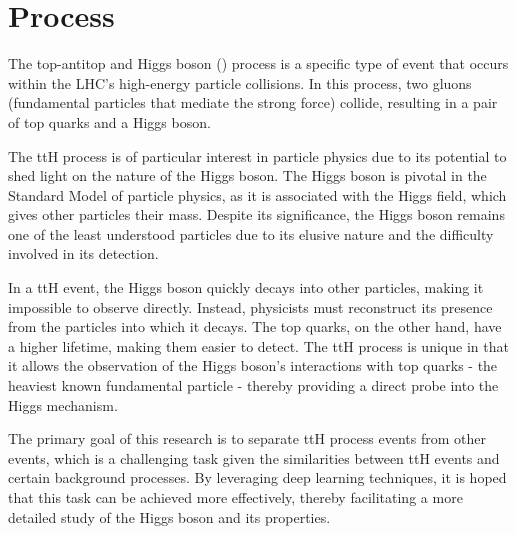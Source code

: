\section{\tth Process}

The top-antitop and Higgs boson (\tth) process is a specific type of event that occurs within the LHC's high-energy
particle collisions. In this process, two gluons (fundamental particles that mediate the strong force) collide,
resulting in a pair of top quarks and a Higgs boson.

The ttH process is of particular interest in particle physics due to its potential to shed light on the nature of the
Higgs boson. The Higgs boson is pivotal in the Standard Model of particle physics, as it is associated with the Higgs
field, which gives other particles their mass. Despite its significance, the Higgs boson remains one of the least
understood particles due to its elusive nature and the difficulty involved in its detection.

In a ttH event, the Higgs boson quickly decays into other particles, making it impossible to observe directly. Instead,
physicists must reconstruct its presence from the particles into which it decays. The top quarks, on the other hand,
have a higher lifetime, making them easier to detect. The ttH process is unique in that it allows the observation of the
Higgs boson's interactions with top quarks - the heaviest known fundamental particle - thereby providing a direct probe
into the Higgs mechanism.

The primary goal of this research is to separate ttH process events from other events, which is a challenging task given
the similarities between ttH events and certain background processes. By leveraging deep learning techniques, it is
hoped that this task can be achieved more effectively, thereby facilitating a more detailed study of the Higgs boson and
its properties.

